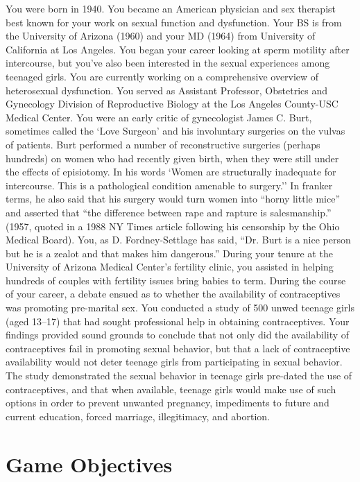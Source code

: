 You were born in 1940. You became an American physician and sex therapist best known for your work on sexual function and dysfunction. Your BS is from the University of Arizona (1960) and your MD (1964) from University of California at Los Angeles.
You began your career looking at sperm motility after intercourse, but you've also been interested in the sexual experiences among teenaged girls.
You are currently working on a comprehensive overview of heterosexual dysfunction. You served as Assistant Professor, Obstetrics and Gynecology Division of Reproductive Biology at the Los Angeles County-USC Medical Center.
You were an early critic of gynecologist James C. Burt, sometimes called the `Love Surgeon' and his involuntary surgeries on the vulvas of patients. Burt performed a number of reconstructive surgeries (perhaps hundreds) on women who had recently given birth, when they were still under the effects of episiotomy. In his words `Women are structurally inadequate for intercourse. This is a pathological condition amenable to surgery.'' In franker terms, he also said that his surgery would turn women into ``horny little mice'' and asserted that ``the difference between rape and rapture is salesmanship.'' (1957, quoted in a 1988 NY Times article following his censorship by the Ohio Medical Board). You, as D. Fordney-Settlage has said, ``Dr. Burt is a nice person but he is a zealot and that makes him dangerous.''
During your tenure at the University of Arizona Medical Center’s fertility clinic, you assisted in helping hundreds of couples with fertility issues bring babies to term. During the course of your career, a debate ensued as to whether the availability of contraceptives was promoting pre-marital sex.
You conducted a study of 500 unwed teenage girls (aged 13--17) that had sought professional help in obtaining contraceptives. Your findings provided sound grounds to conclude that not only did the availability of contraceptives fail in promoting sexual behavior, but that a lack of contraceptive availability would not deter teenage girls from participating in sexual behavior. The study demonstrated the sexual behavior in teenage girls pre-dated the use of contraceptives, and that when available, teenage girls would make use of such options in order to prevent unwanted pregnancy, impediments to future and current education, forced marriage, illegitimacy, and abortion.

\section{Game Objectives}
\label{gameobjectives}

